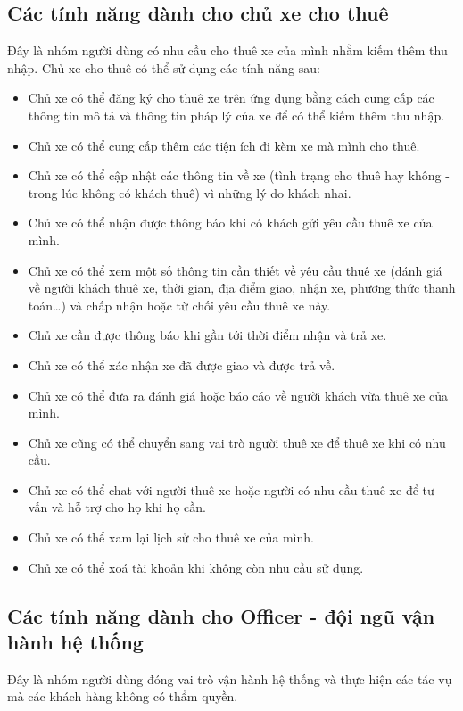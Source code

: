 \documentclass[../main.tex]{subfiles}
\begin{document}
	\subsection{Các tính năng dành cho chủ xe cho thuê}

	Đây là nhóm người dùng có nhu cầu cho thuê xe của mình nhằm kiếm thêm thu nhập. Chủ xe cho thuê có thể sử dụng các
	tính năng sau:

	\begin{itemize}
		\item Chủ xe có thể đăng ký cho thuê xe trên ứng dụng bằng cách cung cấp các thông tin mô tả và thông tin pháp lý
		của xe để có thể kiếm thêm thu nhập.
		\item Chủ xe có thể cung cấp thêm các tiện ích đi kèm xe mà mình cho thuê.
		\item Chủ xe có thể cập nhật các thông tin về xe (tình trạng cho thuê hay không - trong lúc không có khách thuê) vì
		những lý do khách nhai.
		\item Chủ xe có thể nhận được thông báo khi có khách gửi yêu cầu thuê xe của mình.
		\item Chủ xe có thể xem một số thông tin cần thiết về yêu cầu thuê xe (đánh giá về người khách thuê xe, thời gian,
		địa điểm giao, nhận xe, phương thức thanh toán\ldots) và chấp nhận hoặc từ chối yêu cầu thuê xe này.
		\item Chủ xe cần được thông báo khi gần tới thời điểm nhận và trả xe.
		\item Chủ xe có thể xác nhận xe đã được giao và được trả về.
		\item Chủ xe có thể đưa ra đánh giá hoặc báo cáo về người khách vừa thuê xe của mình.
		\item Chủ xe cũng có thể chuyển sang vai trò người thuê xe để thuê xe khi có nhu cầu.
		\item Chủ xe có thể chat với người thuê xe hoặc người có nhu cầu thuê xe để tư vấn và hỗ trợ cho họ khi họ cần.
		\item Chủ xe có thể xam lại lịch sử cho thuê xe của mình.
		\item Chủ xe có thể xoá tài khoản khi không còn nhu cầu sử dụng.
	\end{itemize}

	\subsection{Các tính năng dành cho Officer - đội ngũ vận hành hệ thống}

	Đây là nhóm người dùng đóng vai trò vận hành hệ thống và thực hiện các tác vụ mà các khách hàng không có thẩm quyền.
\end{document}
